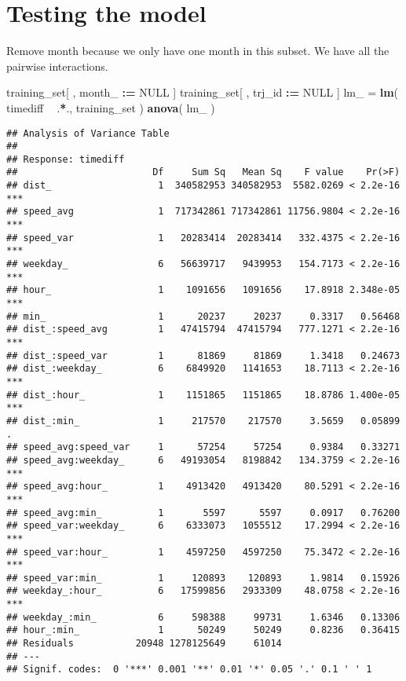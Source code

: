 \documentclass[]{article}
\newenvironment{Shaded}{\begin{snugshade}}{\end{snugshade}}
\newcommand{\ErrorTok}[1]{\textcolor[rgb]{0.64,0.00,0.00}{\textbf{#1}}}
\newcommand{\KeywordTok}[1]{\textcolor[rgb]{0.13,0.29,0.53}{\textbf{#1}}}
\newcommand{\NormalTok}[1]{#1}
\newcommand{\OperatorTok}[1]{\textcolor[rgb]{0.81,0.36,0.00}{\textbf{#1}}}
\newcommand{\OtherTok}[1]{\textcolor[rgb]{0.56,0.35,0.01}{#1}}
\newcommand{\StringTok}[1]{\textcolor[rgb]{0.31,0.60,0.02}{#1}}
\begin{document}
\hypertarget{testing-the-model}{%
\section{Testing the model}\label{testing-the-model}}

Remove month because we only have one month in this subset. We have all
the pairwise interactions.

\begin{Shaded}
\begin{Highlighting}[]
\NormalTok{training_set[ , month_ }\OperatorTok{:}\ErrorTok{=}\StringTok{ }\OtherTok{NULL}\NormalTok{ ]}
\NormalTok{training_set[ , trj_id }\OperatorTok{:}\ErrorTok{=}\StringTok{ }\OtherTok{NULL}\NormalTok{ ]}
\NormalTok{lm_ =}\StringTok{ }\KeywordTok{lm}\NormalTok{( timediff }\OperatorTok{~}\StringTok{ }\NormalTok{.}\OperatorTok{*}\NormalTok{., training_set )}
\KeywordTok{anova}\NormalTok{( lm_ )}
\end{Highlighting}
\end{Shaded}

\begin{verbatim}
## Analysis of Variance Table
## 
## Response: timediff
##                        Df     Sum Sq   Mean Sq    F value    Pr(>F)    
## dist_                   1  340582953 340582953  5582.0269 < 2.2e-16 ***
## speed_avg               1  717342861 717342861 11756.9804 < 2.2e-16 ***
## speed_var               1   20283414  20283414   332.4375 < 2.2e-16 ***
## weekday_                6   56639717   9439953   154.7173 < 2.2e-16 ***
## hour_                   1    1091656   1091656    17.8918 2.348e-05 ***
## min_                    1      20237     20237     0.3317   0.56468    
## dist_:speed_avg         1   47415794  47415794   777.1271 < 2.2e-16 ***
## dist_:speed_var         1      81869     81869     1.3418   0.24673    
## dist_:weekday_          6    6849920   1141653    18.7113 < 2.2e-16 ***
## dist_:hour_             1    1151865   1151865    18.8786 1.400e-05 ***
## dist_:min_              1     217570    217570     3.5659   0.05899 .  
## speed_avg:speed_var     1      57254     57254     0.9384   0.33271    
## speed_avg:weekday_      6   49193054   8198842   134.3759 < 2.2e-16 ***
## speed_avg:hour_         1    4913420   4913420    80.5291 < 2.2e-16 ***
## speed_avg:min_          1       5597      5597     0.0917   0.76200    
## speed_var:weekday_      6    6333073   1055512    17.2994 < 2.2e-16 ***
## speed_var:hour_         1    4597250   4597250    75.3472 < 2.2e-16 ***
## speed_var:min_          1     120893    120893     1.9814   0.15926    
## weekday_:hour_          6   17599856   2933309    48.0758 < 2.2e-16 ***
## weekday_:min_           6     598388     99731     1.6346   0.13306    
## hour_:min_              1      50249     50249     0.8236   0.36415    
## Residuals           20948 1278125649     61014                         
## ---
## Signif. codes:  0 '***' 0.001 '**' 0.01 '*' 0.05 '.' 0.1 ' ' 1
\end{verbatim}
\end{document}
